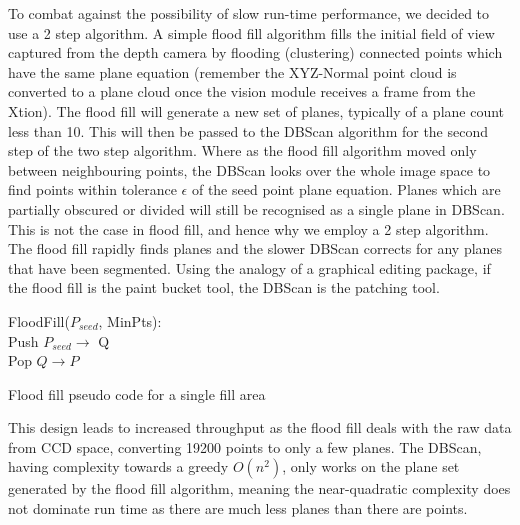 \documentclass[]{article}
\begin{document}
{To combat against the possibility of slow run-time performance, we decided to use a 2 step algorithm. A simple flood fill algorithm fills the initial field of view captured from the depth camera by flooding (clustering) connected points which have the same plane equation (remember the XYZ-Normal point cloud is converted to a plane cloud once the vision module receives a frame from the Xtion). The flood fill will generate a new set of planes, typically of a plane count less than 10. This will then be passed to the DBScan algorithm for the second step of the two step algorithm. Where as the flood fill algorithm moved only between neighbouring points, the DBScan looks over the whole image space to find points within tolerance $\epsilon$ of the seed point plane equation. Planes which are partially obscured or divided  will still be recognised as a single plane in DBScan. This is not the case in flood fill, and hence why we employ a 2 step algorithm. The flood fill rapidly finds planes and the slower DBScan corrects for any planes that have been segmented. Using the analogy of a graphical editing package, if the flood fill is the paint bucket tool, the DBScan is the patching tool.

\begin{algorithm}[tbp]
	\SetAlgoLined
	\bigskip
	FloodFill($P_{seed}$, MinPts): \\
	Push $P_{seed} \rightarrow$ Q \\
	{
	 	Pop $Q \rightarrow P$ \\
	}
	\bigskip
	\caption{Flood fill pseudo code for a single fill area}
	\label{alg:flood_fill}
\end{algorithm}

This design leads to increased throughput as the flood fill deals with the raw data from CCD space, converting 19200 points to only a few planes. The DBScan, having complexity towards a greedy $O(n^{2})$, only works on the plane set generated by the flood fill algorithm, meaning the near-quadratic complexity does not dominate run time as there are much less planes than there are points.

}
\end{document}
